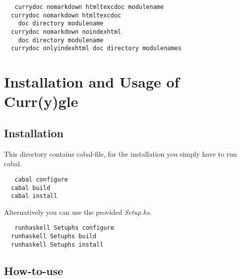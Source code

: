 \documentclass[%
	pdftex,%
	a4paper,%
	oneside,%
	chapterprefix,%
	headsepline,%
	12pt%
]{scrbook}
\begin{document}
\begin{tabbing}\tt
~~currydoc~nomarkdown~htmltexcdoc~modulename\\
\tt ~~currydoc~nomarkdown~htmltexcdoc~\\
\tt ~~~~doc~directory~modulename\\
\tt ~~currydoc~nomarkdown~noindexhtml~\\
\tt ~~~~doc~directory~modulename\\
\tt ~~currydoc~onlyindexhtml~doc~directory~modulenames
\end{tabbing}

\chapter{Installation and Usage of Curr(y)gle}\label{a:currysearch}

\section{Installation}

This directory contains cabal-file, for the installation you simply
have to run cabal.

\begin{tabbing}\tt
~~cabal~configure~\\
\tt ~~cabal~build~\\
\tt ~~cabal~install
\end{tabbing}

Alternatively you can use the provided \emph{Setup.hs}.
\begin{tabbing}\tt
~~runhaskell~Setuphs~configure\\
\tt ~~runhaskell~Setuphs~build\\
\tt ~~runhaskell~Setuphs~install
\end{tabbing}

\section{How-to-use}
\end{document}
